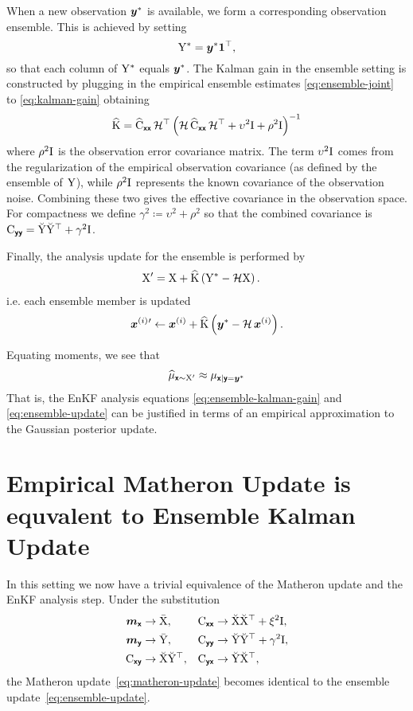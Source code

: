 \documentclass[wcp]{jmlr} %
\begin{document}
When a new observation \(\boldsymbol{y}^*\) is available, we form a corresponding observation ensemble.
This is achieved by setting
\[
\mathrm{Y}^* = \boldsymbol{y}^* \mathbf{1}^\top,
\]
so that each column of \(\mathrm{Y}^*\) equals \(\boldsymbol{y}^*\).
The Kalman gain in the ensemble setting is constructed by plugging in the empirical ensemble estimates \eqref{eq:ensemble-joint} to \eqref{eq:kalman-gain} obtaining
\begin{align}
\widehat{\mathrm{K}}= \widehat{\mathrm{C}}_{\boldsymbol{\mathsf{xx}}}\, \mathcal{H}^\top \left(\mathcal{H}\,\widehat{\mathrm{C}}_{\boldsymbol{\mathsf{xx}}}\, \mathcal{H}^\top + \upsilon^2\mathrm{I} + \rho^2\mathrm{I}\right)^{-1}\label{eq:ensemble-kalman-gain}
\end{align}
where \(\rho^2\mathrm{I}\) is the observation error covariance matrix.
The term
$\upsilon^2\mathrm{I}$ comes from the regularization of the empirical observation covariance (as defined by the ensemble of
$\mathrm{Y}$), while $\rho^2\mathrm{I}$ represents the known covariance of the observation noise.
Combining these two gives the effective covariance in the observation space.
For compactness we define \(\gamma^2 \coloneq \upsilon^2 + \rho^2\) so that the combined covariance is \(\mathrm{C}_{\boldsymbol{\mathsf{yy}}} = \breve{\mathrm{Y}} \breve{\mathrm{Y}}^\top + \gamma^2\mathrm{I}\).

Finally, the analysis update for the ensemble is performed by
\begin{align}
    \mathrm{X}' &= \mathrm{X} + \widehat{\mathrm{K}} \left(\mathrm{Y}^* - \mathcal{H}\mathrm{X}\right).\label{eq:ensemble-update}
\end{align}
i.e. each ensemble member is updated
\begin{align}
\boldsymbol{x}^{(i)}{}' \gets \boldsymbol{x}^{(i)} + \widehat{\mathrm{K}} \left(\boldsymbol{y}^* - \mathcal{H}\,\boldsymbol{x}^{(i)}\right).
\end{align}

Equating moments, we see that
\begin{align}
\ELaw[\vrv{x}\sim \mm{X}']
\approx \Law[\vrv{x} \gvn \vrv{y}=\vv{y}^*]
\end{align}
That is, the EnKF analysis equations \eqref{eq:ensemble-kalman-gain} and \eqref{eq:ensemble-update} can be justified in terms of an empirical approximation to the Gaussian posterior update.

\section{Empirical Matheron Update is equvalent to Ensemble Kalman Update}
In this setting we now have a trivial equivalence of the Matheron update and the EnKF analysis step.
Under the substitution
\begin{align}
    \boldsymbol{m}_{\boldsymbol{\mathsf{x}}} &\to \bar{\mathrm{X}}, & \mathrm{C}_{\boldsymbol{\mathsf{xx}}} &\to \breve{\mathrm{X}} \breve{\mathrm{X}}^\top + \xi^2\mathrm{I},\\
    \boldsymbol{m}_{\boldsymbol{\mathsf{y}}} &\to \bar{\mathrm{Y}}, & \mathrm{C}_{\boldsymbol{\mathsf{yy}}} &\to \breve{\mathrm{Y}} \breve{\mathrm{Y}}^\top + \gamma^2\mathrm{I},\\
    \mathrm{C}_{\boldsymbol{\mathsf{xy}}} &\to \breve{\mathrm{X}} \breve{\mathrm{Y}}^\top, & \mathrm{C}_{\boldsymbol{\mathsf{yx}}} &\to \breve{\mathrm{Y}} \breve{\mathrm{X}}^\top,
\end{align}
the Matheron update~\eqref{eq:matheron-update} becomes identical to the ensemble update~\eqref{eq:ensemble-update}.
\end{document}
